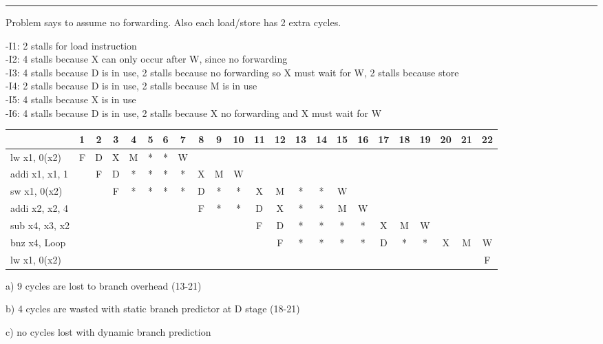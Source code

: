 \documentclass[11pt]{exam}
\newcounter{questionCounter}
\newcounter{partCounter}[questionCounter]
\newenvironment{namedquestion}[1]{%
    \addtocounter{questionCounter}{1}%
    \setcounter{partCounter}{0}%
    \vspace{.2in}%
        \noindent{\bf #1}%
    \vspace{0.3em} \hrule \vspace{.1in}%
}{}
\begin{document}
\newpage

\begin{namedquestion}{Question 3.11}

Problem says to assume no forwarding. Also each load/store has 2 extra cycles.

-I1: 2 stalls for load instruction \\
-I2: 4 stalls because X can only occur after W, since no forwarding\\
-I3: 4 stalls because D is in use, 2 stalls because no forwarding so X must wait for W, 2 stalls because store\\ 
-I4: 2 stalls because D is in use, 2 stalls because M is in use \\
-I5: 4 stalls because X is in use\\
-I6: 4 stalls because D is in use, 2 stalls because X no forwarding and X must wait for W\\

\begingroup
\footnotesize{

    \medskip
    \centering
    \def\arraystretch{1.5}
        \begin{tabular}{llccccccccccccccccccccc}
            \toprule
            & 1& 2& 3& 4& 5& 6& 7& 8& 9& 10& 11& 12 &13 & 14 & 15 & 16 & 17 & 18 & 19 & 20 & 21 & 22\\
            \midrule
            lw  x1, 0(x2) & F & D & X & M & * & * &  W\\
            addi x1, x1, 1 & & F & D & * & * & * & * & X & M & W\\
            sw  x1, 0(x2) &&& F & * & * & * & * & D & *&* & X & M & *& * & W\\
            addi x2, x2, 4 &&&&&&&& F & *& *& D & X &* &*&M & W\\
            sub x4, x3, x2 &&&&&&&&&&& F & D & * & * & *&*&X & M & W\\
            bnz x4, Loop &&&&&&&&&&&& F & * & * &*&* & D & * & * &X & M & W\\
            \midrule
            lw x1, 0(x2) &&&&&&&&&&&&&&&&&&&&&& F\\
            \bottomrule
        \end{tabular}
    \label{fig:c2table2}
    \medskip
}
\endgroup


a) 9 cycles are lost to branch overhead (13-21)

b) 4 cycles are wasted with static branch predictor at D stage (18-21)

c) no cycles lost with dynamic branch prediction
\end{namedquestion}

\printbibliography
\end{document}
